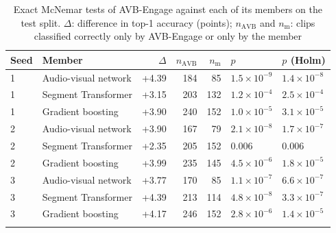 \documentclass[pdflatex,sn-basic]{sn-jnl}
\newcommand{\ournet}{AVB-Engage}
\begin{document}
\begin{table}[t]
\caption{Exact McNemar tests of \ournet{} against each of its members on the test split. $\Delta$: difference in top-1 accuracy (points); $n_{\mathrm{AVB}}$ and $n_{\mathrm{m}}$: clips classified correctly only by \ournet{} or only by the member}\label{tab:sig_fusion}
\begin{tabular*}{\textwidth}{@{\extracolsep\fill}llrrrll}
\toprule
Seed & Member & $\Delta$ & $n_{\mathrm{AVB}}$ & $n_{\mathrm{m}}$ & $p$ & $p$ (Holm)\\
\midrule
1 & Audio-visual network & +4.39 & 184 & 85 & $1.5 \times 10^{-9}$ & $1.4 \times 10^{-8}$\\
1 & Segment Transformer & +3.15 & 203 & 132 & $1.2 \times 10^{-4}$ & $2.5 \times 10^{-4}$\\
1 & Gradient boosting & +3.90 & 240 & 152 & $1.0 \times 10^{-5}$ & $3.1 \times 10^{-5}$\\
2 & Audio-visual network & +3.90 & 167 & 79 & $2.1 \times 10^{-8}$ & $1.7 \times 10^{-7}$\\
2 & Segment Transformer & +2.35 & 205 & 152 & 0.006 & 0.006\\
2 & Gradient boosting & +3.99 & 235 & 145 & $4.5 \times 10^{-6}$ & $1.8 \times 10^{-5}$\\
3 & Audio-visual network & +3.77 & 170 & 85 & $1.1 \times 10^{-7}$ & $6.6 \times 10^{-7}$\\
3 & Segment Transformer & +4.39 & 213 & 114 & $4.8 \times 10^{-8}$ & $3.3 \times 10^{-7}$\\
3 & Gradient boosting & +4.17 & 246 & 152 & $2.8 \times 10^{-6}$ & $1.4 \times 10^{-5}$\\
\botrule
\end{tabular*}
\end{table}
\end{document}

